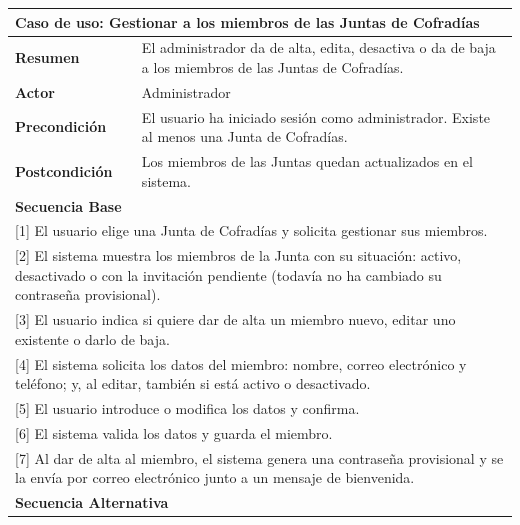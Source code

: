 \begin{table}[h!]
    \centering
    \renewcommand{\arraystretch}{1.3}

    \begin{tabular}{|p{4cm}|p{11cm}|}
        \hline
        \multicolumn{2}{|l|}{\textbf{Caso de uso: Gestionar a los miembros de las Juntas de Cofradías}} \\
        \hline
        \textbf{Resumen} & El administrador da de alta, edita, desactiva o da de baja a los miembros de las Juntas de Cofradías. \\
        \hline
        \textbf{Actor} & Administrador \\
        \hline
        \textbf{Precondición} & El usuario ha iniciado sesión como administrador. Existe al menos una Junta de Cofradías. \\
        \hline
        \textbf{Postcondición} & Los miembros de las Juntas quedan actualizados en el sistema. \\
        \hline
        \multicolumn{2}{|l|}{\textbf{Secuencia Base}} \\
        \hline
        \multicolumn{2}{|p{15cm}|}{ [1] El usuario elige una Junta de Cofradías y solicita gestionar sus miembros. } \\
        \hline
        \multicolumn{2}{|p{15cm}|}{ [2] El sistema muestra los miembros de la Junta con su situación: activo, desactivado o con la invitación pendiente (todavía no ha cambiado su contraseña provisional). } \\
        \hline
        \multicolumn{2}{|p{15cm}|}{ [3] El usuario indica si quiere dar de alta un miembro nuevo, editar uno existente o darlo de baja. } \\
        \hline
        \multicolumn{2}{|p{15cm}|}{ [4] El sistema solicita los datos del miembro: nombre, correo electrónico y teléfono; y, al editar, también si está activo o desactivado. } \\
        \hline
        \multicolumn{2}{|p{15cm}|}{ [5] El usuario introduce o modifica los datos y confirma. } \\
        \hline
        \multicolumn{2}{|p{15cm}|}{ [6] El sistema valida los datos y guarda el miembro. } \\
        \hline
        \multicolumn{2}{|p{15cm}|}{ [7] Al dar de alta al miembro, el sistema genera una contraseña provisional y se la envía por correo electrónico junto a un mensaje de bienvenida. } \\
        \hline
        \multicolumn{2}{|l|}{\textbf{Secuencia Alternativa}} \\

\end{tabular}
\end{table}
